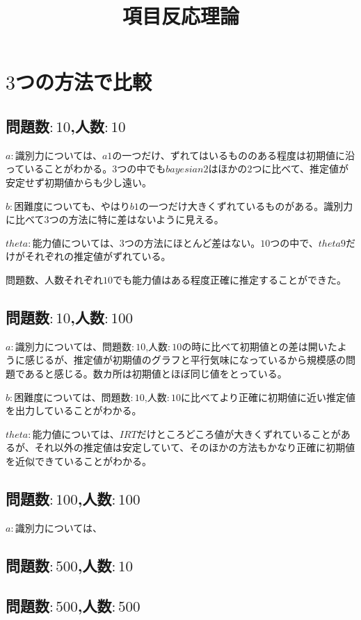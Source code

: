 \documentclass[12pt]{jarticle}
\title{項目反応理論}
\begin{document}
\maketitle
\section{$3$つの方法で比較}
\subsection{問題数$:10$,人数$:10$}
$a:$識別力については、$a1$の一つだけ、ずれてはいるもののある程度は初期値に沿っていることがわかる。$3$つの中でも$bayesian2$はほかの$2$つに比べて、推定値が安定せず初期値からも少し遠い。

$b:$困難度についても、やはり$b1$の一つだけ大きくずれているものがある。識別力に比べて$3$つの方法に特に差はないように見える。

$theta:$能力値については、$3$つの方法にほとんど差はない。$10$つの中で、$theta9$だけがそれぞれの推定値がずれている。

問題数、人数それぞれ$10$でも能力値はある程度正確に推定することができた。


\subsection{問題数$:10$,人数$:100$}
$a:$識別力については、問題数$:10$,人数$:10$の時に比べて初期値との差は開いたように感じるが、推定値が初期値のグラフと平行気味になっているから規模感の問題であると感じる。数カ所は初期値とほぼ同じ値をとっている。

$b:$困難度については、問題数$:10$,人数$:10$に比べてより正確に初期値に近い推定値を出力していることがわかる。

$theta:$能力値については、$IRT$だけところどころ値が大きくずれていることがあるが、それ以外の推定値は安定していて、そのほかの方法もかなり正確に初期値を近似できていることがわかる。
\subsection{問題数$:100$,人数$:100$}
$a:$識別力については、
\subsection{問題数$:500$,人数$:10$}
\subsection{問題数$:500$,人数$:500$}
\end{document}
